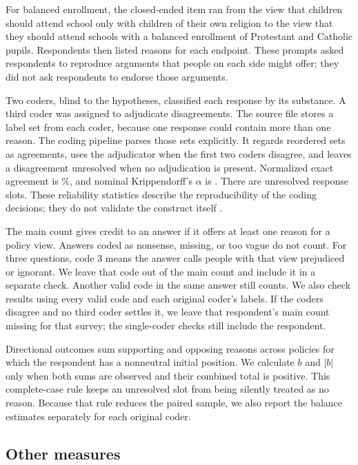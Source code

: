 \documentclass[11pt]{article}
\begin{document}
For balanced enrollment, the closed-ended item ran from the view that children should attend
school only with children of their own religion to the view that they should attend schools
with a balanced enrollment of Protestant and Catholic pupils. Respondents then listed reasons
for each endpoint. These prompts asked respondents to reproduce arguments that people on each
side might offer; they did not ask respondents to endorse those arguments.

Two coders, blind to the hypotheses, classified each response by its substance. A third coder
was assigned to adjudicate disagreements. The source file stores a label set from each coder,
because one response could contain more than one reason. The coding pipeline parses those
sets explicitly. It regards reordered sets as agreements, uses the adjudicator when the first
two coders disagree, and leaves a disagreement unresolved when no adjudication is present.
Normalized exact agreement is \CoderAgreement\%, and nominal Krippendorff's $\alpha$ is
\CoderAlpha{}. There are \UnresolvedSlots{} unresolved response slots. These reliability
statistics describe the reproducibility of the coding decisions; they do not validate the
construct itself \citep{krippendorff1980content,krippendorff1986information,
krippendorff2004content}.

The main count gives credit to an answer if it offers at least one reason for a policy view.
Answers coded as nonsense, missing, or too vague do not count. For three questions, code 3 means
the answer calls people with that view prejudiced or ignorant. We leave that code out of the
main count and include it in a separate check. Another valid code in the same answer still
counts. We also check results using every valid code and each original coder's labels. If the
coders disagree and no third coder settles it, we leave that respondent's main count missing
for that survey; the single-coder checks still include the respondent.

Directional outcomes sum supporting and opposing reasons across policies for which the
respondent has a nonneutral initial position. We calculate $b$ and $|b|$ only when both sums
are observed and their combined total is positive. This complete-case rule keeps an unresolved
slot from being silently treated as no reason. Because that rule reduces the paired sample, we
also report the balance estimates separately for each original coder.

\subsection{Other measures}
\end{document}
